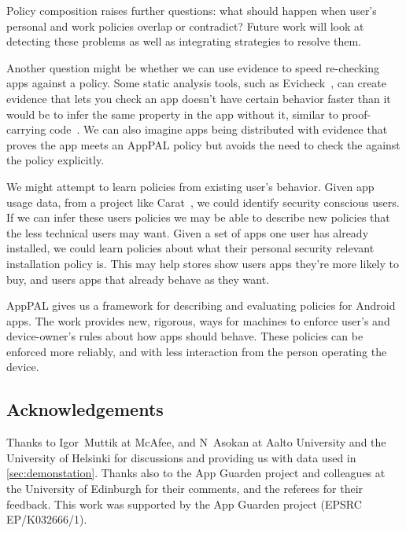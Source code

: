 \documentclass[]{llncs}
\begin{document}
Policy composition raises further questions: what should happen when user's
personal and work policies overlap or contradict?
Future work will look at detecting these problems as well as integrating strategies to resolve them.

Another question might be whether we can use evidence to speed re-checking apps against a policy.
Some static analysis tools, such as Evicheck~\cite{Seghir:2015er}, can create evidence that lets you check an app doesn't have certain behavior faster than it would be to infer the same property in the app without it, similar to proof-carrying code~\cite{Necula:1996tr}.
We can also imagine apps being distributed with evidence that proves the app meets an AppPAL policy but avoids the need to check the against the policy explicitly.

We might attempt to learn policies from existing user's behavior.
Given app usage data, from a project like Carat~\cite{Oliner:2013ht}, we could identify security conscious users.
If we can infer these users policies we may be able to describe new policies that the less technical users may want.
Given a set of apps one user has already installed, we could learn policies about what their personal security relevant installation policy is.
This may help stores show users apps they're more likely to buy, and users apps that already behave as they want.

AppPAL gives us a framework for describing and evaluating policies for Android apps.
The work provides new, rigorous, ways for machines to enforce user's and device-owner's rules about how apps should behave.
These policies can be enforced more reliably, and with less interaction from the person operating the device.

\subsection*{Acknowledgements}

Thanks to Igor~Muttik at McAfee, and N~Asokan at Aalto University and the University of Helsinki for discussions and providing us with data used in \autoref{sec:demonstation}.
Thanks also to the App Guarden project and colleagues at the University of Edinburgh for their comments, and the referees for their feedback.
This work was supported by the App Guarden project (EPSRC EP/K032666/1).



\end{document}
